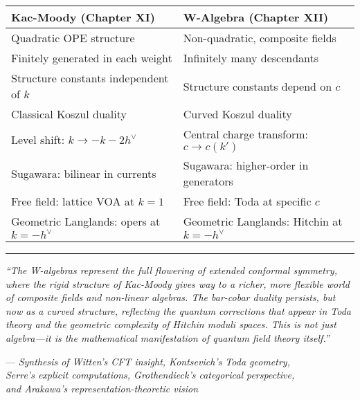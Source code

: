 \begin{center}
\begin{tabular}{|p{5cm}|p{5cm}|}
\hline
\textbf{Kac-Moody (Chapter XI)} & \textbf{W-Algebra (Chapter XII)} \\
\hline
Quadratic OPE structure & Non-quadratic, composite fields \\
\hline
Finitely generated in each weight & Infinitely many descendants \\
\hline
Structure constants independent of $k$ & Structure constants depend on $c$ \\
\hline
Classical Koszul duality & Curved Koszul duality \\
\hline
Level shift: $k \to -k-2h^\vee$ & Central charge transform: $c \to c(k')$ \\
\hline
Sugawara: bilinear in currents & Sugawara: higher-order in generators \\
\hline
Free field: lattice VOA at $k=1$ & Free field: Toda at specific $c$ \\
\hline
Geometric Langlands: opers at $k=-h^\vee$ & Geometric Langlands: Hitchin at $k=-h^\vee$ \\
\hline
\end{tabular}
\end{center}

\bigskip

\begin{center}
\rule{0.5\textwidth}{0.4pt}

\textit{``The W-algebras represent the full flowering of extended conformal symmetry, where the rigid structure of Kac-Moody gives way to a richer, more flexible world of composite fields and non-linear algebras. The bar-cobar duality persists, but now as a curved structure, reflecting the quantum corrections that appear in Toda theory and the geometric complexity of Hitchin moduli spaces. This is not just algebra—it is the mathematical manifestation of quantum field theory itself.''}

— \textit{Synthesis of Witten's CFT insight, Kontsevich's Toda geometry, \\Serre's explicit computations, Grothendieck's categorical perspective, \\and Arakawa's representation-theoretic vision}
\end{center}